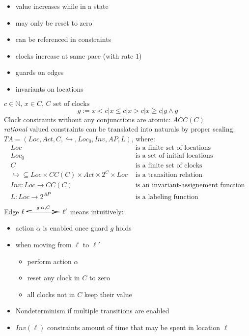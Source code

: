 \documentclass[a4paper, 10pt]{article}
\begin{document}
\begin{mdframed}
\begin{itemize}
    \item value increases while in a state
    \item may only be reset to zero
    \item can be referenced in constraints
    \item clocks increase at same pace (with rate $1$)
    \item[\follows] guards on edges
    \item[\follows] invariants on locations
\end{itemize}
$c\in\mathds{N},\, x\in C,\, C \text{ set of clocks}$
\[ g:= x<c | x\leq c | x>c | x\geq c | g\wedge g \]
Clock constraints without any conjunctions are atomic: $ACC(C)$ \\
\follows \emph{rational} valued constraints can be translated into naturals by proper scaling.
$TA=(Loc,Act,C,\hookrightarrow,Loc_0,Inv,AP,L)$, where:
\begin{align*}
Loc & \text{ is a finite set of locations} \\
Loc_0 & \text{ is a set of initial locations} \\
C & \text{ is a finite set of clocks} \\
\hookrightarrow\subseteq Loc\times CC(C)\times Act\times2^C\times Loc & \text{ is a transition relation} \\
Inv: Loc\to CC(C) & \text{ is an invariant-assignement function} \\
L:Loc\to2^{AP} & \text{ is a labeling function} \\
\end{align*}
Edge $\ell \overset{g:\alpha, C}{\scalebox{5}[1]{$\hookrightarrow$}} \ell'$ means intuitively:
\begin{itemize}
    \item action $\alpha$ is enabled once guard $g$ holds
    \item when moving from $\ell$ to $\ell'$
    \begin{itemize}
        \item perform action $\alpha$
        \item reset any clock in $C$ to zero
        \item all clocks not in $C$ keep their value
    \end{itemize}
    \item Nondeterminism if multiple transitions are enabled
    \item $Inv(\ell)$ constraints amount of time that may be spent in location $\ell$

\end{itemize}
\end{mdframed}
\end{document}
